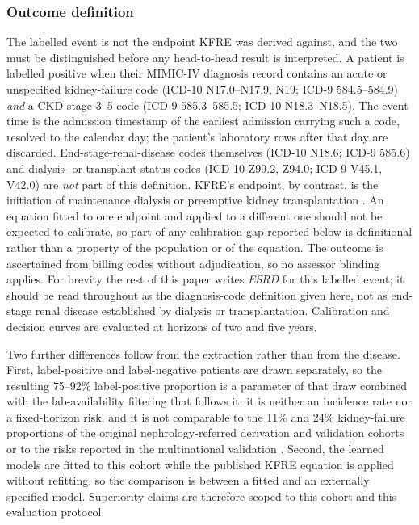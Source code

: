 \documentclass[10pt,letterpaper]{article}
\begin{document}
\subsubsection*{Outcome definition}\label{sec:outcome}
The labelled event is not the endpoint KFRE was derived against, and the two must be distinguished before any head-to-head result is interpreted. A patient is labelled positive when their MIMIC-IV diagnosis record contains an acute or unspecified kidney-failure code (ICD-10 N17.0--N17.9, N19; ICD-9 584.5--584.9) \emph{and} a CKD stage 3--5 code (ICD-9 585.3--585.5; ICD-10 N18.3--N18.5). The event time is the admission timestamp of the earliest admission carrying such a code, resolved to the calendar day; the patient's laboratory rows after that day are discarded. End-stage-renal-disease codes themselves (ICD-10 N18.6; ICD-9 585.6) and dialysis- or transplant-status codes (ICD-10 Z99.2, Z94.0; ICD-9 V45.1, V42.0) are \emph{not} part of this definition. KFRE's endpoint, by contrast, is the initiation of maintenance dialysis or preemptive kidney transplantation \cite{tangri2011predicting,tangri2016multinational}. An equation fitted to one endpoint and applied to a different one should not be expected to calibrate, so part of any calibration gap reported below is definitional rather than a property of the population or of the equation. The outcome is ascertained from billing codes without adjudication, so no assessor blinding applies. For brevity the rest of this paper writes \emph{ESRD} for this labelled event; it should be read throughout as the diagnosis-code definition given here, not as end-stage renal disease established by dialysis or transplantation. Calibration and decision curves are evaluated at horizons of two and five years.

Two further differences follow from the extraction rather than from the disease. First, label-positive and label-negative patients are drawn separately, so the resulting 75--92\% label-positive proportion is a parameter of that draw combined with the lab-availability filtering that follows it: it is neither an incidence rate nor a fixed-horizon risk, and it is not comparable to the 11\% and 24\% kidney-failure proportions of the original nephrology-referred derivation and validation cohorts \cite{tangri2011predicting} or to the risks reported in the multinational validation \cite{tangri2016multinational}. Second, the learned models are fitted to this cohort while the published KFRE equation is applied without refitting, so the comparison is between a fitted and an externally specified model. Superiority claims are therefore scoped to this cohort and this evaluation protocol.
\end{document}

